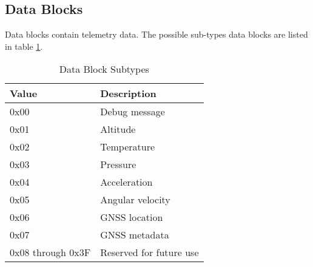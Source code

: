 \subsection{Data Blocks}

Data blocks contain telemetry data. The possible sub-types data blocks are listed in table \ref{table:data-subtypes}.

\begin{table}[H]
    \centering
    \begin{tabular}{@{}ll@{}}
        \toprule
        Value             & Description             \\
        \midrule
        0x00              & Debug message           \\
        0x01              & Altitude                \\
        0x02              & Temperature             \\
        0x03              & Pressure                \\
        0x04              & Acceleration            \\
        0x05              & Angular velocity        \\
        0x06              & GNSS location           \\
        0x07              & GNSS metadata           \\
        0x08 through 0x3F & Reserved for future use \\
        \bottomrule
    \end{tabular}
    \caption{Data Block Subtypes}
    \label{table:data-subtypes}
\end{table}









